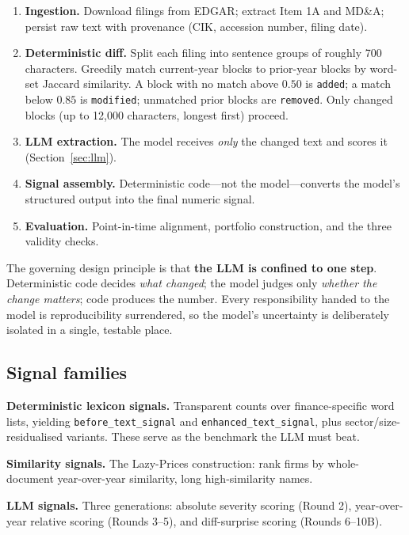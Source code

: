 \documentclass[11pt]{article}
\newcommand{\sig}[1]{\texttt{#1}}
\begin{document}
\begin{enumerate}[leftmargin=1.6em,itemsep=0.2em]
  \item \textbf{Ingestion.} Download filings from EDGAR; extract Item 1A and MD\&A;
        persist raw text with provenance (CIK, accession number, filing date).
  \item \textbf{Deterministic diff.} Split each filing into sentence groups of roughly
        700 characters. Greedily match current-year blocks to prior-year blocks by
        word-set Jaccard similarity. A block with no match above $0.50$ is
        \sig{added}; a match below $0.85$ is \sig{modified}; unmatched prior blocks are
        \sig{removed}. Only changed blocks (up to 12{,}000 characters, longest first)
        proceed.
  \item \textbf{LLM extraction.} The model receives \emph{only} the changed text and
        scores it (Section~\ref{sec:llm}).
  \item \textbf{Signal assembly.} Deterministic code---not the model---converts the
        model's structured output into the final numeric signal.
  \item \textbf{Evaluation.} Point-in-time alignment, portfolio construction, and the
        three validity checks.
\end{enumerate}

The governing design principle is that \textbf{the LLM is confined to one step}.
Deterministic code decides \emph{what changed}; the model judges only \emph{whether the
change matters}; code produces the number. Every responsibility handed to the model is
reproducibility surrendered, so the model's uncertainty is deliberately isolated in a
single, testable place.

\subsection{Signal families}

\textbf{Deterministic lexicon signals.} Transparent counts over finance-specific word
lists, yielding \sig{before\_text\_signal} and \sig{enhanced\_text\_signal}, plus
sector/size-residualised variants. These serve as the benchmark the LLM must beat.

\textbf{Similarity signals.} The Lazy-Prices construction: rank firms by whole-document
year-over-year similarity, long high-similarity names.

\textbf{LLM signals.} Three generations: absolute severity scoring (Round 2), year-over-year
relative scoring (Rounds 3--5), and diff-surprise scoring (Rounds 6--10B).
\end{document}
